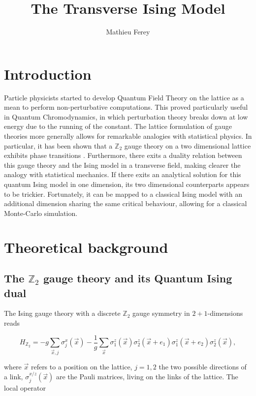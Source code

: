 \documentclass[11pt,openany]{article}
\title{The Transverse Ising Model }
\author{Mathieu Ferey}
\begin{document}
	


\tableofcontents\clearpage

\section{Introduction}

Particle physicists started to develop Quantum Field Theory on the lattice as a mean to perform non-perturbative computations. This proved particularly useful in Quantum Chromodynamics, in which perturbation theory breaks down at low energy due to the running of the constant. The lattice formulation of gauge theories more generally allows for remarkable analogies with statistical physics. In particular, it has been shown that a $\mathds{Z}_2$ gauge theory on a two dimensional lattice exhibits phase transitions \cite{Wegner}. Furthermore, there exits a duality relation between this gauge theory and the Ising model in a transverse field, making clearer the analogy with statistical mechanics. If there exits an analytical solution for this quantum Ising model in one dimension, its two dimensional counterparts appears to be trickier. Fortunately, it can be mapped to a classical Ising model with an additional dimension sharing the same critical behaviour, allowing for a classical Monte-Carlo simulation.

\section{Theoretical background}

\subsection{The $\mathds{Z}_2$ gauge theory and its Quantum Ising dual}

The Ising gauge theory with a discrete $\mathds{Z}_2$ gauge symmetry in $2+1$-dimensions \cite{fradkin} reads

\begin{equation}
	H_{\mathds{Z}_2} = -g\sum_{\vec{x},j}\sigma^x_j(\vec{x}) - \frac{1}{g}\sum_{\vec{x}}\sigma_1^z(\vec{x})\sigma_2^z(\vec{x}+e_1)\sigma_1^z(\vec{x}+e_2)\sigma_2^z(\vec{x}),
\end{equation}

where $\vec{x}$ refers to a position on the lattice, $j=1,2$ the two possible directions of a link, $\sigma_j^{x/z}(\vec{x})$ are the Pauli matrices, living on the links of the lattice. The local operator
\end{document}
